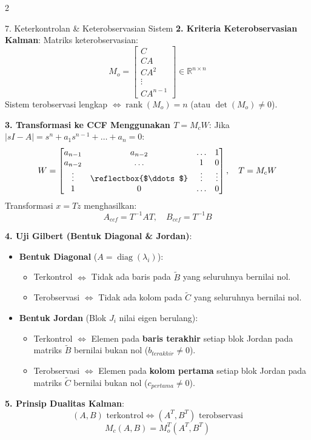 \documentclass[10pt,a4paper]{article}
\begin{document}
\begin{multicols*}{2}
\begin{rumusbox}{7. Keterkontrolan \& Keterobservasian Sistem}
\textbf{2. Kriteria Keterobservasian Kalman}:
Matriks keterobservasian:
$$M_o = \begin{bmatrix} C \\ CA \\ CA^2 \\ \vdots \\ CA^{n-1} \end{bmatrix} \in \mathbb{R}^{n \times n}$$
Sistem terobservasi lengkap $\iff \operatorname{rank}(M_o) = n$ (atau $\det(M_o) \ne 0$).

\textbf{3. Transformasi ke CCF Menggunakan $T = M_c W$}:
Jika $|sI - A| = s^n + a_1 s^{n-1} + \dots + a_n = 0$:
{\scriptsize
$$W = \begin{bmatrix} a_{n-1} & a_{n-2} & \dots & 1 \\ a_{n-2} & \dots & 1 & 0 \\ \vdots & \reflectbox{$\ddots$} & \vdots & \vdots \\ 1 & 0 & \dots & 0 \end{bmatrix}, \quad T = M_c W$$
}
Transformasi $x = Tz$ menghasilkan:
$$A_{ccf} = T^{-1} A T, \quad B_{ccf} = T^{-1} B$$

\textbf{4. Uji Gilbert (Bentuk Diagonal \& Jordan)}:
\begin{itemize}\setlength\itemsep{1pt}
    \item \textbf{Bentuk Diagonal} ($A = \operatorname{diag}(\lambda_i)$):
    \begin{itemize}\setlength\itemsep{0pt}
        \item Terkontrol $\iff$ Tidak ada baris pada $\tilde{B}$ yang seluruhnya bernilai nol.
        \item Terobservasi $\iff$ Tidak ada kolom pada $\tilde{C}$ yang seluruhnya bernilai nol.
    \end{itemize}
    \item \textbf{Bentuk Jordan} (Blok $J_i$ nilai eigen berulang):
    \begin{itemize}\setlength\itemsep{0pt}
        \item Terkontrol $\iff$ Elemen pada \textbf{baris terakhir} setiap blok Jordan pada matriks $\tilde{B}$ bernilai bukan nol ($b_{terakhir} \ne 0$).
        \item Terobservasi $\iff$ Elemen pada \textbf{kolom pertama} setiap blok Jordan pada matriks $\tilde{C}$ bernilai bukan nol ($c_{pertama} \ne 0$).
    \end{itemize}
\end{itemize}

\textbf{5. Prinsip Dualitas Kalman}:
$$(A, B) \text{ terkontrol} \iff (A^T, B^T) \text{ terobservasi}$$
$$M_c(A, B) = M_o^T(A^T, B^T)$$
\end{rumusbox}


\end{multicols*}
\end{document}
